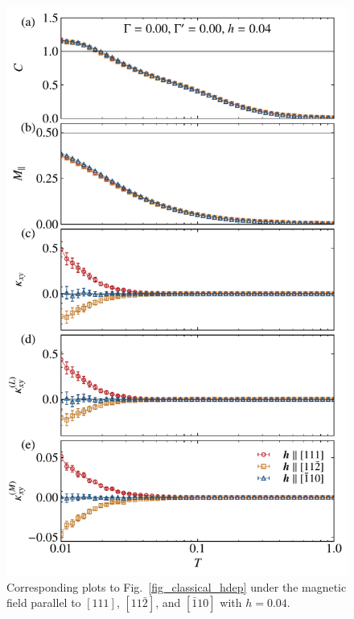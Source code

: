 \documentclass[twocolumn,superscriptaddress,showpacs, longbibliography, aps, prx]{revtex4-2}
\begin{document}
\begin{figure}[tbh] 
\begin{center} 
\includegraphics[width=\linewidth]{Data_for_figs/plot/fig-13-classical-adep.pdf}
\vspace{-0.5cm} 
\caption{Corresponding plots to Fig.~\ref{fig_classical_hdep} under the magnetic field parallel to $[111]$, $[11\bar{2}]$, and $[\bar{1}10]$ with $h=0.04$.
}
\label{fig_classical_adep004}
\end{center}
\end{figure}
  
\end{document}
